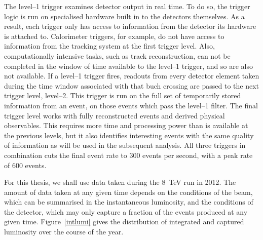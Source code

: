 The level--1 trigger examines detector output in real time. To do so, the trigger logic is run on specialised hardware built in to the detectors themselves. As a result, each trigger only has access to information from the detector its hardware is attached to. Calorimeter triggers, for example, do not have access to information from the tracking system at the first trigger level. Also, computationally intensive tasks, such as track reconstruction, can not be completed in the window of time available to the level--1 trigger, and so are also not available. If a level--1 trigger fires, readouts from every detector element taken during the time window associated with that buch crossing are passed to the next trigger level, level--2. This trigger is run on the full set of temporarily stored information from an event, on those events which pass the level--1 filter. The final trigger level works with fully reconstructed events and derived physical observables. This requires more time and processing power than is available at the previous levels, but it also identifies interesting events with the same quality of information as will be used in the subsequent analysis. All three triggers in combination cuts the final event rate to 300 events per second, with a peak rate of 600 events.

For this thesis, we shall use data taken during the 8~TeV run in 2012. The amount of data taken at any given time depends on the conditions of the beam, which can be summarised in the instantaneous luminosity, and the conditions of the detector, which may only capture a fraction of the events produced at any given time. Figure~\ref{intlumi} gives the distribution of integrated and captured luminosity over the course of the year.

